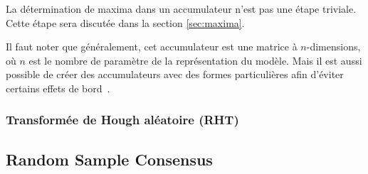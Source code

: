 La détermination de maxima dans un accumulateur n'est pas une étape triviale. Cette étape sera discutée dans la section \ref{sec:maxima}.

Il faut noter que généralement, cet accumulateur est une matrice à $n$-dimensions, où $n$ est le nombre de paramètre de la représentation du modèle. Mais il est aussi possible de créer des accumulateurs avec des formes particulières afin d'éviter certains effets de bord~\cite{Borrmann2011}.

\subsubsection{Transformée de Hough aléatoire (RHT)}

\subsection{Random Sample Consensus}
